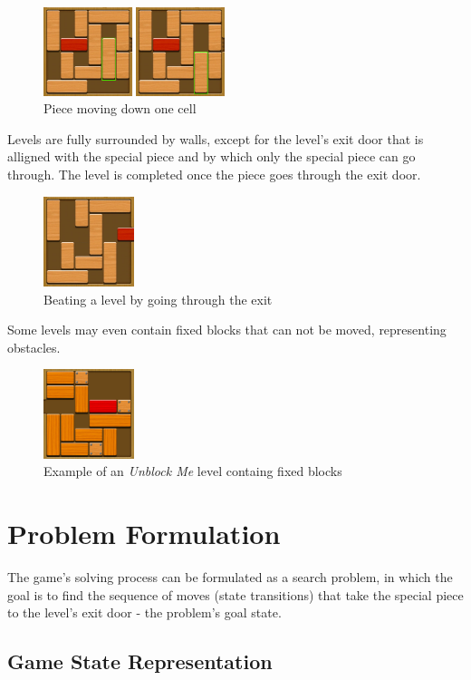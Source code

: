 \documentclass[conference]{IEEEtran}
\begin{document}
\begin{figure}[H]
    \centerline{\includegraphics[width=200px]{img2.png}}
    \caption{Piece moving down one cell}
\end{figure}

Levels are fully surrounded by walls, except for the level's exit door that is alligned with the special piece and by which only the special piece can go through. The level is completed once the piece goes through the exit door.
 
\begin{figure}[H]
    \centerline{\includegraphics[width=100px]{img3.png}}
    \caption{Beating a level by going through the exit}
    \label{img:final_state}
\end{figure}

Some levels may even contain fixed blocks that can not be moved, representing obstacles.
 
\begin{figure}[H]
    \centerline{\includegraphics[width=100px]{img4.png}}
    \caption{Example of an \textit{Unblock Me} level containg fixed blocks}
\end{figure}

\section{Problem Formulation}
The game's solving process can be formulated as a search problem, in which the goal is to find the sequence of moves (state transitions) that take the special piece to the level's exit door - the problem's goal state. 

\subsection{Game State Representation} \label{subsec:gr}
\end{document}
